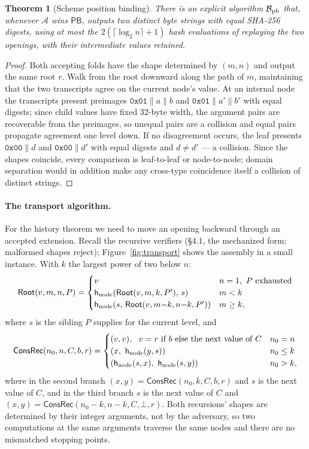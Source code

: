 \documentclass[11pt]{article}
\newtheorem{theorem}{Theorem}
\theoremstyle{remark}
\newcommand{\hnode}{\mathsf{h}_{\rm node}}
\newcommand{\Root}{\mathsf{Root}}
\newcommand{\ConsRec}{\mathsf{ConsRec}}
\begin{document}
\begin{theorem}[Scheme position binding]\label{thm:pb}
There is an explicit algorithm $\mathcal{B}_{\rm pb}$ that, whenever
$\mathcal{A}$ wins $\mathsf{PB}$, outputs two distinct byte strings with
equal SHA-256 digests, using at most the $2(\lceil\log_2 n\rceil{+}1)$ hash
evaluations of replaying the two openings, with their intermediate values
retained.
\end{theorem}
\begin{proof}
Both accepting folds have the shape determined by $(m,n)$ and output the same
root $r$. Walk from the root downward along the path of $m$, maintaining that
the two transcripts agree on the current node's value. At an internal node
the transcripts present preimages $\mathtt{0x01}\|a\|b$ and
$\mathtt{0x01}\|a'\|b'$ with equal digests; since child values have fixed
32-byte width, the argument pairs are recoverable from the preimages, so
unequal pairs are a collision and equal pairs propagate agreement one level
down. If no disagreement occurs, the leaf presents $\mathtt{0x00}\|d$ and
$\mathtt{0x00}\|d'$ with equal digests and $d\neq d'$ --- a collision. Since
the shapes coincide, every comparison is leaf-to-leaf or node-to-node; domain
separation would in addition make any cross-type coincidence itself a
collision of distinct strings.
\end{proof}

\paragraph{The transport algorithm.}
For the history theorem we need to move an opening backward through an
accepted extension. Recall the recursive verifiers (\S4.1, the mechanized
form; malformed shapes reject); Figure~\ref{fig:transport} shows the assembly in a
small instance. With $k$ the largest power of two below $n$:
\[
\Root(v,m,n,P)=
\begin{cases}
v & n=1,\ P\ \text{exhausted}\\
\hnode(\Root(v,m,k,P'),\,s) & m<k\\
\hnode(s,\,\Root(v,m{-}k,n{-}k,P')) & m\ge k,
\end{cases}
\]
where $s$ is the sibling $P$ supplies for the current level, and
\[
\ConsRec(n_0,n,C,b,r)=
\begin{cases}
(v,v),\ \ v=r\ \text{if}\ b\ \text{else the next value of}\ C & n_0=n\\
(x,\ \hnode(y,s)) & n_0\le k\\
(\hnode(s,x),\ \hnode(s,y)) & n_0>k,
\end{cases}
\]
where in the second branch $(x,y)=\ConsRec(n_0,k,C,b,r)$ and $s$ is the next
value of $C$, and in the third branch $s$ is the next value of $C$ and
$(x,y)=\ConsRec(n_0{-}k,n{-}k,C,\bot,r)$. Both recursions' shapes are
determined by their integer arguments, not by the adversary, so two
computations at the same arguments traverse the same nodes and there are no
mismatched stopping points.
\end{document}
